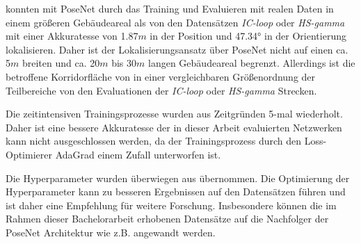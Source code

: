 
\citet{walchImageBasedLocalizationUsing2017} konnten mit PoseNet durch das Training und Evaluieren mit realen Daten in einem größeren Gebäudeareal als von den Datensätzen \textit{IC-loop} oder \textit{HS-gamma} mit einer Akkuratesse von 1.87$m$ in der Position und 47.34° in der Orientierung lokalisieren. Daher ist der Lokalisierungsansatz über PoseNet nicht auf einen ca. 5$m$ breiten und ca. 20$m$ bis 30$m$ langen Gebäudeareal begrenzt. Allerdings ist die betroffene Korridorfläche von \citet{acharyaBIMPoseNetIndoorCamera2019} in einer vergleichbaren Größenordnung der Teilbereiche von den Evaluationen der \textit{IC-loop} oder \textit{HS-gamma} Strecken.







%






Die zeitintensiven Trainingsprozesse wurden aus Zeitgründen 5-mal wiederholt. Daher ist eine bessere Akkuratesse der in dieser Arbeit evaluierten Netzwerken kann nicht ausgeschlossen werden, da der Trainingsprozess durch den Loss-Optimierer AdaGrad einem Zufall unterworfen ist.

Die Hyperparameter wurden überwiegen aus \citet{acharyaBIMPoseNetIndoorCamera2019} übernommen. Die Optimierung der Hyperparameter kann zu besseren Ergebnissen auf den Datensätzen führen und ist daher eine Empfehlung für weitere Forschung. Insbesondere können die im Rahmen dieser Bachelorarbeit erhobenen Datensätze auf die Nachfolger der PoseNet Architektur wie z.B. \cite{kendallModellingUncertaintyDeep2016, walchImageBasedLocalizationUsing2017, kendallGeometricLossFunctions2017, clarkVidLocDeepSpatioTemporal2017} angewandt werden.


% 


